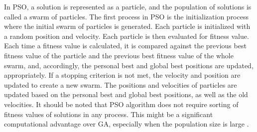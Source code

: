 In PSO, a solution is represented as a particle, and the population of solutions is called a swarm of particles. The first process in PSO is the initialization process where the initial swarm of particles is generated. Each particle is initialized with a random position and velocity. Each particle is then evaluated for fitness value. Each time a fitness value is calculated, it is compared against the previous best fitness value of the particle and the previous best fitness value of the whole swarm, and, accordingly, the personal best and global best positions are updated, appropriately. If a stopping criterion is not met, the velocity and position are updated to create a new swarm. The positions and velocities of particles are updated based on the personal best and global best positions, as well as the
old velocities. It should be noted that PSO algorithm does not require sorting of fitness values of solutions in any process. This might be a significant computational advantage over GA, especially when the population size is large \cite{Kachitvichyanuku:2012} \cite{Eberhart:2001}.
